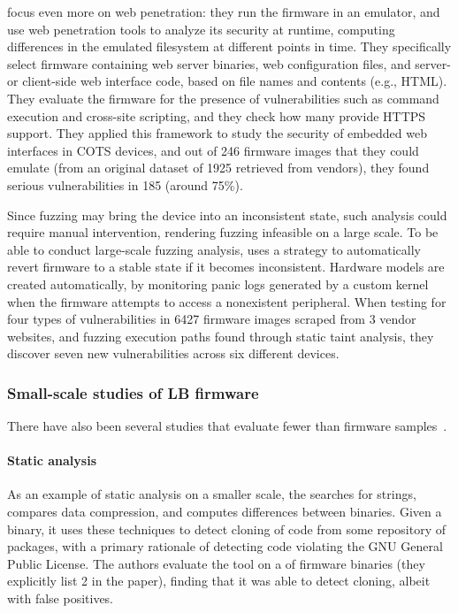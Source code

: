  focus even more on web penetration: they run the firmware in an emulator, and use web penetration tools to analyze its security at runtime, computing differences in the emulated filesystem at different points in time.
They specifically select firmware containing web server binaries, web configuration files, and server- or client-side web interface code, based on file names and contents (e.g., HTML).
They evaluate the firmware for the presence of vulnerabilities such as command execution and cross-site scripting, and they check how many provide HTTPS support.
They applied this framework to study the security of embedded web interfaces in COTS devices, and out of \num{246} firmware images that they could emulate (from an original dataset of \num{1925} retrieved from vendors), they found serious vulnerabilities in \num{185} (around 75\%).

Since fuzzing may bring the device into an inconsistent state, such analysis could require manual intervention, rendering fuzzing infeasible on a large scale.
To be able to conduct large-scale fuzzing analysis,  uses a  strategy to automatically revert firmware to a stable state if it becomes inconsistent.
Hardware models are created automatically, by monitoring panic logs generated by a custom kernel when the firmware attempts to access a nonexistent peripheral.
When testing for four types of vulnerabilities in \num{6427} firmware images scraped from \num{3} vendor websites, and fuzzing  execution paths found through static taint analysis, they discover seven new vulnerabilities across six different devices.

\subsubsection{Small-scale studies of LB firmware}
There have also been several studies that evaluate fewer than  firmware samples~\cite{chen2021sharing, thomas2017humidify, hemel2011finding, gui2020firmcorn, zheng2019firmafl, yu2019poster}.

\paragraph{Static analysis}
As an example of static analysis on a smaller scale, the  searches for strings, compares data compression, and computes differences between binaries.
Given a binary, it uses these techniques to detect cloning of code from some repository of packages, with a primary rationale of detecting code violating the GNU General Public License.
The authors evaluate the tool on a  of firmware binaries (they explicitly list \num{2} in the paper), finding that it was able to detect cloning, albeit with false positives.

